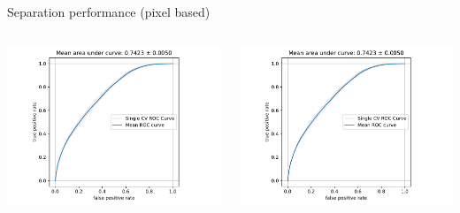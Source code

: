 \begin{frame}[t]{Separation performance (pixel based)}
  \begin{columns}[onlytextwidth]
    \begin{column}{0.475\textwidth}
      \centering
      \includegraphics[width=1.1\textwidth, page=1]{fig/separation_performance_nc_diff.pdf}
    \end{column}
  \hfill%
    \begin{column}{0.475\textwidth}
        \centering
        \includegraphics[width=\textwidth, page=2]{fig/separation_performance_nc_diff.pdf}
    \end{column}
  \end{columns}
\end{frame}







